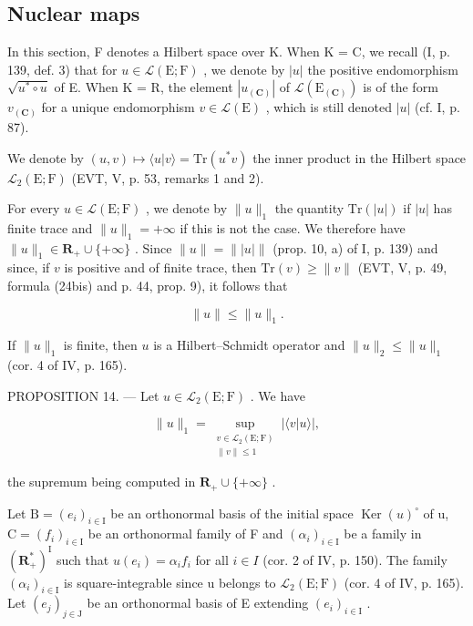 \subsection{Nuclear maps}

In this section, F denotes a Hilbert space over K. When K = C, we recall (I, p. 139, def. 3) that for \(u \in \mathcal{L}(\mathrm{E}; \mathrm{F})\) , we denote by \(|u|\) the positive endomorphism \(\sqrt{u^{*} \circ u}\) of E. When K = R, the element \(|u_{(\mathbf{C})}|\) of \(\mathcal{L}(\mathrm{E}_{(\mathbf{C})})\) is of the form \(v_{(\mathbf{C})}\) for a unique endomorphism \(v \in \mathcal{L}(\mathrm{E})\) , which is still denoted \(|u|\) (cf. I, p. 87).

We denote by \((u,v)\mapsto\langle u|v\rangle=\mathrm{Tr}(u^{*}v)\) the inner product in the Hilbert space \(\mathcal{L}_{2}(\mathrm{E};\mathrm{F})\) (EVT, V, p. 53, remarks 1 and 2).

For every \(u \in \mathcal{L}(\mathrm{E};\mathrm{F})\) , we denote by \(\| u\| _1\) the quantity \(\mathrm{Tr}(|u|)\) if \(|u|\) has finite trace and \(\| u\| _1 = +\infty\) if this is not the case. We therefore have \(\| u\| _1 \in \mathbf{R}_+ \cup \{+\infty\}\) . Since \(\| u\| = \| |u|\|\) (prop. 10, a) of I, p. 139) and since, if \(v\) is positive and of finite trace, then \(\mathrm{Tr}(v) \geqslant \| v\|\) (EVT, V, p. 49, formula (24bis) and p. 44, prop. 9), it follows that

\[
\| u \| \leqslant \| u \| _ {1}.\tag{9}
\]

If \(\| u\| _1\) is finite, then \(u\) is a Hilbert--Schmidt operator and \(\| u\| _2 \leqslant \| u\| _1\) (cor. 4 of IV, p. 165).

PROPOSITION 14. --- Let \(u \in \mathcal{L}_2(\mathrm{E};\mathrm{F})\) . We have

\[
\| u\|_{1} = \sup_{\substack{v\in \mathcal{L}_{2}(\mathrm{E};\mathrm{F})\\ \| v\| \leqslant 1}}|\langle v  |  u\rangle |,
\]

the supremum being computed in \(\mathbf{R}_{+} \cup \{+\infty\}\) .

Let \(\mathrm{B} = (e_i)_{i \in \mathrm{I}}\) be an orthonormal basis of the initial space \(\operatorname{Ker}(u)^{\circ}\) of u, \(\mathrm{C} = (f_i)_{i \in \mathrm{I}}\) be an orthonormal family of F and \((\alpha_i)_{i \in \mathrm{I}}\) be a family in \((\mathbf{R}_+^*)^{\mathrm{I}}\) such that \(u(e_i) = \alpha_i f_i\) for all \(i \in I\) (cor. 2 of IV, p. 150). The family \((\alpha_i)_{i \in \mathrm{I}}\) is square-integrable since u belongs to \(\mathcal{L}_2(\mathrm{E};\mathrm{F})\) (cor. 4 of IV, p. 165). Let \((e_j)_{j \in \mathrm{J}}\) be an orthonormal basis of E extending \((e_i)_{i \in \mathrm{I}}\) .

